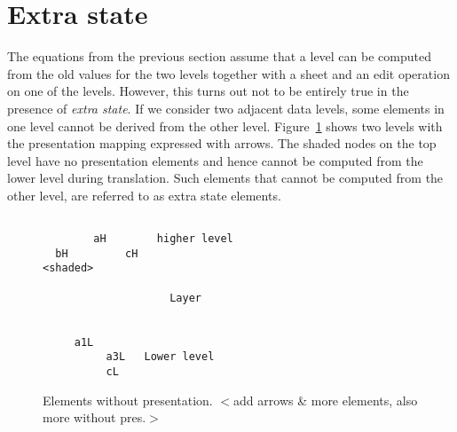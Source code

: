 %										
%										
\section{Extra state} \label{sect:extraState}



The equations from the previous section assume that a level can be computed from the old values for the two levels together with a sheet and an edit operation on one of the levels. However, this turns out not to be entirely true in the presence of {\em extra state}. If we consider two adjacent data levels, some elements in one level cannot be derived from the other level. Figure~\ref{layerExtraState} shows two levels with the presentation mapping expressed with arrows. The shaded nodes on the top level have no presentation elements and hence cannot be computed from the lower level during translation. Such elements that cannot be computed from the other level, are referred to as extra state elements.  


%
\begin{figure}
\begin{center}
\begin{center}
\begin{verbatim}

        aH        higher level
  bH         cH
<shaded>

                    Layer

 
     a1L 
          a3L   Lower level
          cL
\end{verbatim}
\end{center}
\caption{Elements without presentation. $<$add arrows \& more elements, also more without pres.$>$}\label{layerExtraState} 
\end{center}
\end{figure}



